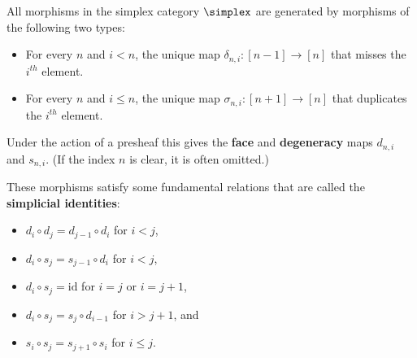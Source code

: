    \begin{property}
        All morphisms in the simplex category $\simplex$ are generated by morphisms of the following two types:
        \begin{itemize}
            \item For every $n$ and $i<n$, the unique map $\delta_{n,i}:[n-1]\rightarrow[n]$ that misses the $i^{th}$ element.
            \item For every $n$ and $i\leq n$, the unique map $\sigma_{n,i}:[n+1]\rightarrow[n]$ that duplicates the $i^{th}$ element.
        \end{itemize}
        Under the action of a presheaf this gives the \textbf{face} and \textbf{degeneracy} maps $d_{n,i}$ and $s_{n,i}$. (If the index $n$ is clear, it is often omitted.)

        These morphisms satisfy some fundamental relations that are called the \textbf{simplicial identities}:
        \begin{itemize}
            \item $d_i\circ d_j = d_{j-1}\circ d_i$ for $i<j$,
            \item $d_i\circ s_j = s_{j-1}\circ d_i$ for $i<j$,
            \item $d_i\circ s_j = \text{id}$ for $i=j$ or $i=j+1$,
            \item $d_i\circ s_j = s_j\circ d_{i-1}$ for $i>j+1$, and
            \item $s_i\circ s_j = s_{j+1}\circ s_i$ for $i\leq j$.
        \end{itemize}
    \end{property}


